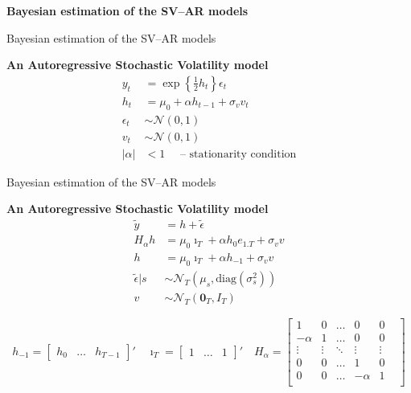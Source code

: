 \documentclass[notes,blackandwhite,mathsans,usenames,dvipsnames]{beamer}
\begin{document}
{
\begin{frame}

\begin{adjustwidth}{-0.5cm}{0cm}
\FlushLeft
\vspace{8.3cm}\Large
\textbf{{\color{mcxs2}Bayesian estimation} {\color{mcxs5}of the SV--AR models}}
\end{adjustwidth}

\end{frame}
}




\begin{frame}{Bayesian estimation of the SV--AR models}

\bigskip\textbf{An Autoregressive Stochastic Volatility model}
\begin{align*}
y_t &= \exp\left\{\frac{1}{2}h_t\right\} \epsilon_t \\
h_t &= \mu_0  +  \alpha h_{t-1} + \sigma_v v_t \\[1ex]
\epsilon_t &\sim \mathcal{N}\left( 0, 1 \right)\\
v_t &\sim\mathcal{N}\left( 0,1 \right)\\[2ex]
|\alpha|&<1 \quad\text{ -- stationarity condition}
\end{align*}


\end{frame}



\begin{frame}{Bayesian estimation of the SV--AR models}

\bigskip\textbf{An Autoregressive Stochastic Volatility model}
\begin{align*}
\tilde{y} &= h + \tilde{\epsilon} \\[1ex]
H_\alpha h &= \mu_0 \imath_T +  \alpha h_0 e_{1.T} + \sigma_v v \\[1ex]
h &= \mu_0 \imath_T +  \alpha h_{-1} + \sigma_v v \\[1ex]
\tilde{\epsilon}|s &\sim \mathcal{N}_T\left( \mu_s, \text{diag}\left(\sigma_s^2\right) \right)\\[1ex]
v &\sim\mathcal{N}_T\left( \mathbf{0}_T, I_T \right)
\end{align*}

\footnotesize
$$
h_{-1} = \begin{bmatrix} h_0& \dots & h_{T-1} \end{bmatrix}'\quad
\imath_T = \begin{bmatrix} 1& \dots & 1 \end{bmatrix}'\quad
H_\alpha = \begin{bmatrix} 
1 & 0 & \dots & 0 &0\\
-\alpha &1&\dots &0&0\\
\vdots&\vdots&\ddots&\vdots&\vdots&\\
0&0&\dots&1&0\\
0&0&\dots&-\alpha&1\\
\end{bmatrix}
$$

\end{frame}
\end{document}
